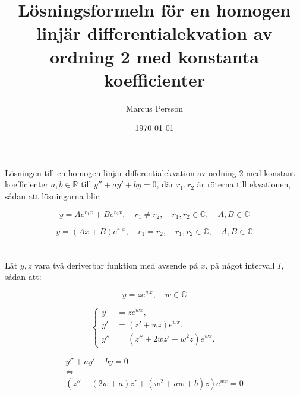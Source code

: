 \documentclass{article}
\title{Lösningsformeln för en homogen linjär differentialekvation av ordning 2 med konstanta koefficienter}
\author{Marcus Persson}
\date{\today}
\begin{document}
\maketitle

\section*{}
\noindent Lösningen till en homogen linjär differentialekvation av ordning 2 med konstant koefficienter $a,b \in \mathbb{R}$ till $y''+ay'+by = 0$, där $r_1,r_2$ är röterna till ekvationen, sådan att lösningarna blir:

\begin{equation}
    y = Ae^{r_1x} + Be^{r_2x},
    \quad r_1 \neq r_2,
    \quad r_1,r_2 \in \mathbb{C},
    \quad A,B \in \mathbb{C}
\end{equation}

\begin{equation}
    y = (Ax+B)e^{r_1x},
    \quad r_1 = r_2, 
    \quad r_1,r_2 \in \mathbb{C},
    \quad A,B \in \mathbb{C}
\end{equation}

\section*{}

Låt $y,z$ vara två deriverbar funktion med avsende på $x$, på något intervall $I$, sådan att:

\begin{equation}
    y = ze^{wx}, 
    \quad w \in \mathbb{C}
\end{equation}

\begin{equation}
\left\{
\begin{aligned}
    y &= ze^{wx},\\
    y' &= (z'+wz)e^{wx},\\
    y'' &= (z''+2wz'+w^2z)e^{wx}.
\end{aligned}
\right.
\end{equation}

\begin{equation}
\begin{gathered}
    y''+ay'+by = 0\\
    \Leftrightarrow\\
    (z''+(2w+a)z'+(w^2+aw+b)z)e^{wx} = 0
\end{gathered}
\end{equation}
\end{document}

